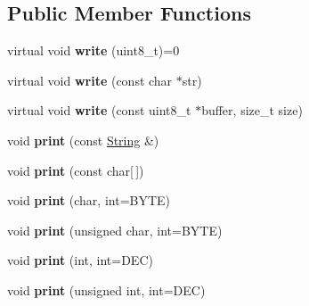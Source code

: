\subsection*{\-Public \-Member \-Functions}
\begin{DoxyCompactItemize}
\item 
\hypertarget{classPrint_ad9393033793cfc17f3e37202ba244892}{
virtual void {\bfseries write} (uint8\-\_\-t)=0}
\label{classPrint_ad9393033793cfc17f3e37202ba244892}

\item 
\hypertarget{classPrint_ae083258d224bae2e5d8a27a4f8338880}{
virtual void {\bfseries write} (const char $\ast$str)}
\label{classPrint_ae083258d224bae2e5d8a27a4f8338880}

\item 
\hypertarget{classPrint_a03094428e21f210e59cc1be63353225d}{
virtual void {\bfseries write} (const uint8\-\_\-t $\ast$buffer, size\-\_\-t size)}
\label{classPrint_a03094428e21f210e59cc1be63353225d}

\item 
\hypertarget{classPrint_a6c1f2f9a1988fe2d4ed593b3ac0185c7}{
void {\bfseries print} (const \hyperlink{classString}{\-String} \&)}
\label{classPrint_a6c1f2f9a1988fe2d4ed593b3ac0185c7}

\item 
\hypertarget{classPrint_aa7b0a6dc63e3d27effd8459e3d443b83}{
void {\bfseries print} (const char\mbox{[}$\,$\mbox{]})}
\label{classPrint_aa7b0a6dc63e3d27effd8459e3d443b83}

\item 
\hypertarget{classPrint_ada24638921c2e86e13c5939c94cf67db}{
void {\bfseries print} (char, int=\-B\-Y\-T\-E)}
\label{classPrint_ada24638921c2e86e13c5939c94cf67db}

\item 
\hypertarget{classPrint_ad7778084a6fe96551d2ec9ce532c5164}{
void {\bfseries print} (unsigned char, int=\-B\-Y\-T\-E)}
\label{classPrint_ad7778084a6fe96551d2ec9ce532c5164}

\item 
\hypertarget{classPrint_a35a6196999c85e5afc5fd852d088e886}{
void {\bfseries print} (int, int=\-D\-E\-C)}
\label{classPrint_a35a6196999c85e5afc5fd852d088e886}

\item 
\hypertarget{classPrint_a5f8df5d4f941b411ce9d660b48996bea}{
void {\bfseries print} (unsigned int, int=\-D\-E\-C)}
\label{classPrint_a5f8df5d4f941b411ce9d660b48996bea}


\end{DoxyCompactItemize}
